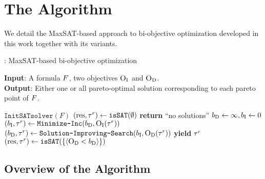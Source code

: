 \chapter{The \algname{} Algorithm\label{chap:approach}}

We detail the MaxSAT-based approach to bi-objective optimization developed in this work together with its variants.

\begin{algorithm}[t]
  \caption{\algname{}: MaxSAT-based  bi-objective optimization} %
  \label{alg:base-algorithm}
  \textbf{Input}: A formula $F$, two objectives $\textsc{O}_{\text{I}}$ and $\textsc{O}_{\text{D}}$.\\
  \textbf{Output}: Either one or all pareto-optimal solution corresponding to each pareto point of $F$.

  \begin{algorithmic}[1]
    \STATE $\texttt{InitSATsolver}(F)$ \label{l:init-solv} 
    \STATE $(\text{res}, \tau^r) \gets \texttt{isSAT}(\emptyset)$ \quad{}  \label{l:sols} 
      \STATE \textbf{return} ``no solutions''
    \ENDIF
    \STATE $b_{\text{D}} \gets \infty, b_{\text{I}} \gets 0$ \label{l:bounds}
     \label{l:loopstart}
      \STATE $(b_{\text{I}}, \tau^r) \gets \texttt{Minimize-\allowbreak{}Inc}(b_{\text{D}} , \textsc{O}_{\text{I}}(\tau^r))$  \quad{}\label{l:minim1}
      \STATE $(b_{\text{D}}, \tau^r) \gets  \texttt{Solution-\allowbreak{}Improving-\allowbreak{}Search}(b_{\text{I}} , \textsc{O}_{\text{D}}(\tau^r))$  \quad{}\label{l:minim2}
      \STATE \textbf{yield} $\tau^r$  \quad{} \label{ln:stage3} 
      \STATE $(\text{res}, \tau^r) \gets \texttt{isSAT}(\{\langle \textsc{O}_{\text{D}} < b_{\text{D}} \rangle\})$\label{l:endL}
    \ENDWHILE
  \end{algorithmic}
\end{algorithm}


\section{Overview of the Algorithm\label{sec:algorithm}}

